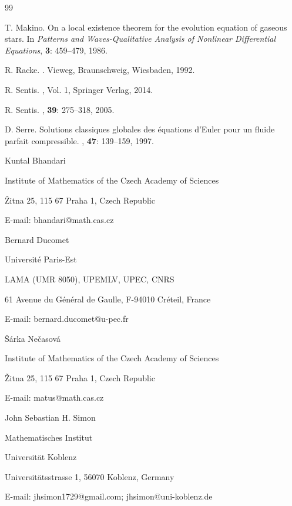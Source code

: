 \documentclass[11pt,twoside]{amsart}
\begin{document}
\begin{thebibliography}{99}



T. Makino.
\newblock On a local existence theorem for the evolution equation of gaseous stars.
\newblock In {\em Patterns and Waves-Qualitative Analysis of Nonlinear Differential Equations}, {\bf 3}: 
459--479, 1986.

R. Racke.
.
\newblock Vieweg, Braunschweig, Wiesbaden, 1992.


R. Sentis.
, Vol. 1,
\newblock Springer Verlag, 2014.

R. Sentis.
, {\bf 39}: 275--318, 2005.

 D. Serre.
\newblock Solutions classiques globales des \'equations d'Euler pour un fluide parfait compressible.
, {\bf 47}: 139--159, 1997.


\end{thebibliography}


\newpage 


\centerline{Kuntal Bhandari}
\centerline{Institute of Mathematics of the Czech Academy of Sciences}
\centerline{\v Zitna 25, 115 67 Praha 1, Czech Republic}
 \centerline{E-mail: bhandari@math.cas.cz}
 \vskip0.5cm
\centerline{Bernard Ducomet}
 \centerline{Universit\'e Paris-Est}
\centerline{LAMA (UMR 8050), UPEMLV, UPEC, CNRS}
\centerline{ 61 Avenue du G\'en\'eral de Gaulle, F-94010 Cr\'eteil, France}
 \centerline{E-mail: bernard.ducomet@u-pec.fr}
 \vskip0.5cm
\centerline{\v S\'arka Ne\v casov\'a}
 \centerline{Institute of Mathematics of the Czech Academy of Sciences}
\centerline{\v Zitna 25, 115 67 Praha 1, Czech Republic}
 \centerline{E-mail: matus@math.cas.cz}
  \vskip0.5cm
\centerline{John Sebastian H. Simon}
\centerline{Mathematisches Institut}
	\centerline{Universit{\"a}t Koblenz}
	\centerline{Universit{\"a}tsstrasse 1, 56070 Koblenz, Germany}
	\centerline{E-mail:  jhsimon1729@gmail.com; jhsimon@uni-koblenz.de}
\end{document}
